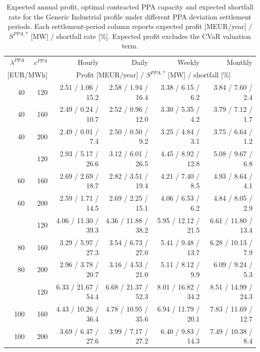 \begin{table}[htbp]
\centering
\scriptsize
\setlength{\tabcolsep}{2.5pt}
\caption{Expected annual profit, optimal contracted PPA capacity and expected shortfall rate for the Generic Industrial profile under different PPA deviation settlement periods. Each settlement-period column reports expected profit [MEUR/year] / $S^{PPA,*}$ [MW] / shortfall rate [\%]. Expected profit excludes the CVaR valuation term.}
\label{tab:settlement_period_generic_industrial}
\begin{tabular*}{\textwidth}{@{\extracolsep{\fill}}rrrrrr@{}}
\toprule
$\lambda^{PPA}$ & $c^{PPA}$ & Hourly & Daily & Weekly & Monthly \\
\multicolumn{2}{c}{[EUR/MWh]} & \multicolumn{4}{c}{Profit [MEUR/year] / $S^{PPA,*}$ [MW] / shortfall [\%]} \\
\midrule
40 & 120 & 2.51 / 1.06 / 15.2 & 2.58 / 1.94 / 16.4 & 3.38 / 6.15 / 6.2 & 3.84 / 7.60 / 2.4 \\
40 & 160 & 2.49 / 0.24 / 10.7 & 2.52 / 0.96 / 12.0 & 3.30 / 5.35 / 4.2 & 3.79 / 7.12 / 1.7 \\
40 & 200 & 2.49 / 0.01 / 7.4 & 2.50 / 0.50 / 9.2 & 3.25 / 4.84 / 3.1 & 3.75 / 6.64 / 1.2 \\
\addlinespace
60 & 120 & 2.93 / 5.17 / 26.6 & 3.12 / 6.01 / 26.5 & 4.45 / 8.92 / 12.8 & 5.08 / 9.67 / 6.8 \\
60 & 160 & 2.69 / 2.69 / 18.7 & 2.82 / 3.51 / 19.4 & 4.21 / 7.40 / 8.5 & 4.93 / 8.64 / 4.1 \\
60 & 200 & 2.59 / 1.71 / 14.5 & 2.69 / 2.25 / 15.1 & 4.06 / 6.53 / 6.2 & 4.84 / 8.05 / 2.9 \\
\addlinespace
80 & 120 & 4.06 / 11.30 / 39.3 & 4.36 / 11.88 / 38.2 & 5.95 / 12.12 / 21.5 & 6.61 / 11.80 / 13.4 \\
80 & 160 & 3.29 / 5.97 / 27.3 & 3.54 / 6.73 / 27.0 & 5.41 / 9.48 / 13.7 & 6.28 / 10.13 / 7.9 \\
80 & 200 & 2.96 / 3.78 / 20.7 & 3.16 / 4.53 / 21.0 & 5.11 / 8.12 / 9.9 & 6.09 / 9.24 / 5.3 \\
\addlinespace
100 & 120 & 6.33 / 21.67 / 54.4 & 6.68 / 21.37 / 52.3 & 8.01 / 16.82 / 34.2 & 8.51 / 14.99 / 24.3 \\
100 & 160 & 4.43 / 10.26 / 36.4 & 4.78 / 10.95 / 35.6 & 6.94 / 11.79 / 20.1 & 7.83 / 11.69 / 12.7 \\
100 & 200 & 3.69 / 6.47 / 27.6 & 3.99 / 7.17 / 27.2 & 6.40 / 9.83 / 14.3 & 7.49 / 10.38 / 8.4 \\
\bottomrule
\end{tabular*}
\end{table}


